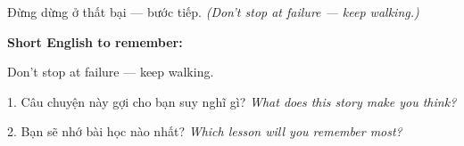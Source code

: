 \begin{baihoc}
Đừng dừng ở thất bại — bước tiếp.
\textit{(Don't stop at failure — keep walking.)}
\end{baihoc}

\begin{ghinhoanh}
\textbf{Short English to remember:}

Don't stop at failure — keep walking.

\end{ghinhoanh}

\begin{tuhocnhanh}
1. Câu chuyện này gợi cho bạn suy nghĩ gì? \textit{What does this story make you think?}

2. Bạn sẽ nhớ bài học nào nhất? \textit{Which lesson will you remember most?}
\end{tuhocnhanh}
\ngancach
